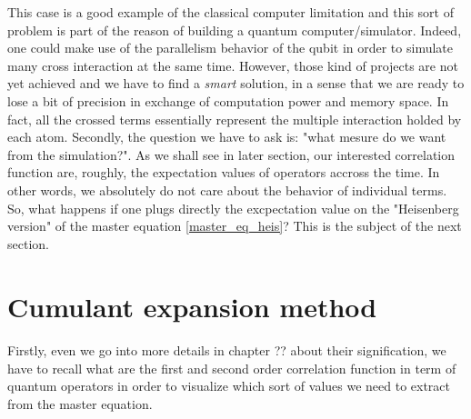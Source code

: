 \documentclass[12pt]{report}
\begin{document}
This case is a good example of the classical computer limitation and this sort of problem is part of the reason of building a quantum computer/simulator. Indeed, one could make use of the parallelism behavior of the qubit in order to simulate many cross interaction at the same time. However, those kind of projects are not yet achieved and we have to find a \textit{smart} solution, in a sense that we are ready to lose a bit of precision in exchange of computation power and memory space. In fact, all the crossed terms essentially represent the multiple interaction holded by each atom. Secondly, the question we have to ask is: "what mesure do we want from the simulation?". As we shall see in later section, our interested correlation function are, roughly, the expectation values of operators accross the time. In other words, we absolutely do not care about the behavior of individual terms. So, what happens if one plugs directly the excpectation value on the "Heisenberg version" of the master equation \eqref{master_eq_heis}? This is the subject of the next section.

\section{Cumulant expansion method}
\paragraph{}

Firstly, even we go into more details in chapter ?? about their signification, we have to recall what are the first and second order correlation function in term of quantum operators in order to visualize which sort of values we need to extract from the master equation.
\end{document}
